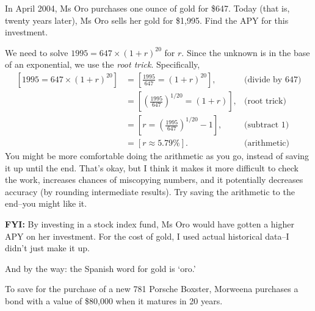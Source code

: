 \documentclass[12pt,fleqn]{exam}
\begin{document}
\begin{questions}
\vfill
\newpage
\question [2] In April 2004, Ms Oro purchases one ounce of gold for \$647. 
Today (that is, twenty years later), Ms Oro sells her gold for \$1,995.
Find the APY for this investment.
\begin{solution}[3.0in]
We need to solve $1995 = 647 \times (1+r)^{20}$ for $r$. Since 
the unknown is in the base of an exponential, we use the \emph{root trick}.
Specifically,
\begin{align*}
    \left[1995 = 647 \times (1+r)^{20} \right] &= \left[\frac{1995}{647} = (1+r)^{20} \right], & \mbox{(divide by 647)}\\
               &= \left[\left(\frac{1995}{647}\right)^{1/20} = (1+r) \right], & \mbox{(root trick)} \\
               &= \left[r = \left(\frac{1995}{647}\right)^{1/20} - 1 \right], & \mbox{(subtract 1)}\\
               &= \left[ r \approx 5.79\% \right]. &\mbox{(arithmetic)}
\end{align*}
You might be more comfortable doing the arithmetic as you go, instead
of saving it up until the end. That's okay, but I think it makes it
more difficult to check the work, increases chances of miscopying
numbers, and it potentially decreases accuracy (by rounding intermediate results).
Try saving the arithmetic to the end--you might like it.

\textbf{FYI:} By investing in a stock index fund, Ms Oro would have
gotten a higher APY on her investment. For the cost of gold, I used 
actual historical data--I didn't just make it up.

And by the way: the Spanish word for gold is `oro.'


\end{solution}


\question To save for the purchase of a new 781 Porsche Boxster,
Morweena purchases a bond with a value of \$80,000 when it matures
in 20 years.

\end{questions}
\end{document}
